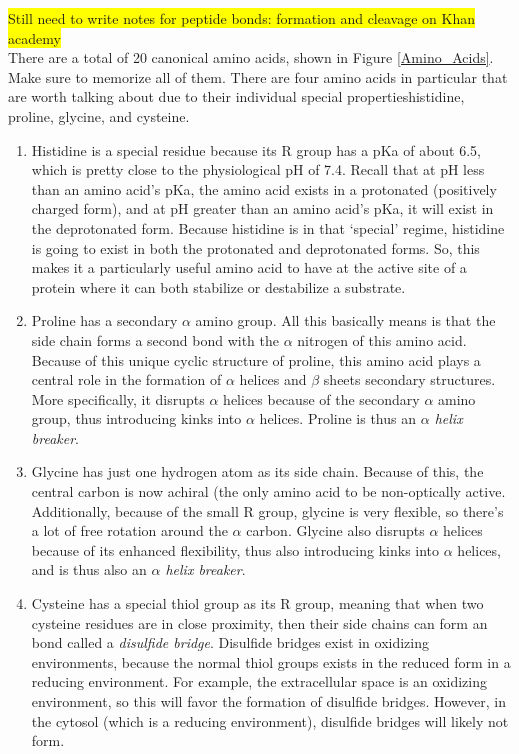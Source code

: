 \documentclass{article}
\theoremstyle{plain}%
\theoremstyle{definition}
\theoremstyle{remark}
\newcommand{\hilight}[1]{\colorbox{yellow}{#1}}
\begin{document}
\hilight{Still need to write notes for peptide bonds: formation and cleavage on Khan academy}\\ %
\indent There are a total of 20 canonical amino acids, shown in Figure \ref{Amino_Acids}. Make sure to memorize all of them. There are four amino acids in particular that are worth talking about due to their individual special properties\textemdash histidine, proline, glycine, and cysteine.
\begin{enumerate}
	\item Histidine is a special residue because its R group has a pKa of about 6.5, which is pretty close to the physiological pH of 7.4. Recall that at pH less than an amino acid's pKa, the amino acid exists in a protonated (positively charged form), and at pH greater than an amino acid's pKa, it will exist in the deprotonated form. Because histidine is in that `special' regime, histidine is going to exist in both the protonated and deprotonated forms. So, this makes it a particularly useful amino acid to have at the active site of a protein where it can both stabilize or destabilize a substrate.
	\item Proline has a secondary $\alpha$ amino group. All this basically means is that the side chain forms a second bond with the $\alpha$ nitrogen of this amino acid. Because of this unique cyclic structure of proline, this amino acid plays a central role in the formation of $\alpha$ helices and $\beta$ sheets secondary structures. More specifically, it disrupts $\alpha$ helices because of the secondary $\alpha$ amino group, thus introducing kinks into $\alpha$ helices. Proline is thus an \textit{$\alpha$ helix breaker}.
	\item Glycine has just one hydrogen atom as its side chain. Because of this, the central carbon is now achiral (the only amino acid to be non-optically active. Additionally, because of the small R group, glycine is very flexible, so there's a lot of free rotation around the $\alpha$ carbon. Glycine also disrupts $\alpha$ helices because of its enhanced flexibility, thus also introducing kinks into $\alpha$ helices, and is thus also an \textit{$\alpha$ helix breaker}. 
	\item Cysteine has a special thiol  group as its R group, meaning that when two cysteine residues are in close proximity, then their side chains can form an  bond called a \textit{disulfide bridge}. Disulfide bridges exist in oxidizing environments, because the normal thiol groups exists in the reduced form in a reducing environment. For example, the extracellular space is an oxidizing environment, so this will favor the formation of disulfide bridges. However, in the cytosol (which is a reducing environment), disulfide bridges will likely not form. 
\end{enumerate}
\end{document}
